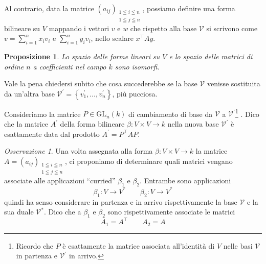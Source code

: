 \documentclass[a4paper]{amsproc}
\newcommand{\en}[1]{\foreignlanguage{english}{\em #1}}
\theoremstyle{plain}
\newtheorem{prp}{Proposizione}[section]
\theoremstyle{definition}
\theoremstyle{remark}
\newtheorem*{oss}{Osservazione}
\newcommand{\GL}{\mathrm{GL}}
\begin{document}
Al contrario, data la matrice $ \left(a_{ij}\right)_{\substack{1\leqq i\leqq n\\1\leqq j\leqq n}} $, possiamo definire una forma bilineare su $ V $ mappando i vettori $ v $ e $ w $ che rispetto alla base $ \mathcal V $ si scrivono come $ v = \sum_{i = 1}^nx_iv_i $ e $ \sum_{i = 1}^ny_iv_i $, nello scalare $ x^\intercal Ay $.

\begin{prp}
  Lo spazio delle forme lineari su $ V $ e lo spazio delle matrici di ordine $ n $ a coefficienti nel campo $ k $ sono isomorfi.
\end{prp}

Vale la pena chiedersi subito che cosa succederebbe se la base $ \mathcal V $ venisse sostituita da un'altra base $ \mathcal V^\prime = \left\{v_1^\prime,\dots,v_n^\prime\right\} $, più pucciosa.

Consideriamo la matrice $ P\in\GL_n(k) $ di cambiamento di base da $ \mathcal V $ a $ \mathcal V^\prime $\footnote{%
  Ricordo che $ P $ è esattamente la matrice associata all'identità di $ V $ nelle basi $ \mathcal V $ in partenza e $ \mathcal V^\prime $ in arrivo.}%
. Dico che la matrice $ A^\prime $ della forma bilineare $ \beta\colon V\times V\to k $ nella nuova base $ \mathcal V^\prime $ è esattamente data dal prodotto $ A^\prime = P^\intercal AP $.

\begin{oss}
  Una volta assegnata alla forma $ \beta\colon V\times V\to k $ la matrice $ A = \left(a_{ij}\right)_{\substack{1\leqq i\leqq n\\1\leqq j\leqq n}} $, ci proponiamo di determinare quali matrici vengano associate alle applicazioni ``curried'' $ \beta_1 $ e $ \beta_2 $. Entrambe sono applicazioni
  \[
    \beta_1\colon V\to V^* \qquad \beta_2\colon V\to V^*
  \]
  quindi ha senso considerare in partenza e in arrivo rispettivamente la base $ \mathcal V $ e la sua duale $ \mathcal V^* $. Dico che a $ \beta_1 $ e $ \beta_2 $ sono rispettivamente associate le matrici
  \[
    A_1 = A^\intercal \qquad A_2 = A
  \]
\end{oss}


\end{document}
